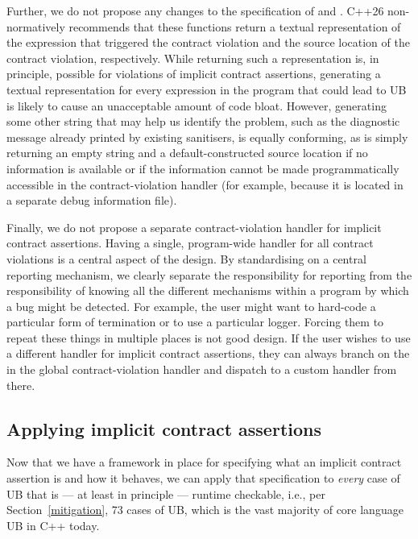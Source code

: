 Further, we do not propose any changes to the specification of  and . C++26 non-normatively recommends that these functions return a textual representation of the expression that triggered the contract violation and the source location of the contract violation, respectively. While returning such a representation is, in principle, possible for violations of implicit contract assertions, generating a textual representation for every expression in the program that could lead to UB is likely to cause an unacceptable amount of code bloat. However, generating some other string that may help us identify the problem, such as the diagnostic message already printed by existing sanitisers, is equally conforming, as is simply returning an empty string and a default-constructed source location if no information is available or if the information cannot be made programmatically accessible in the contract-violation handler (for example,
because it is located in a separate debug information file). 

Finally, we do not propose a separate contract-violation handler for implicit contract assertions. Having a single, program-wide handler for all contract violations is a central aspect of the \cite{P2900R14} design. By standardising on a central reporting mechanism, we clearly separate the responsibility for reporting from the responsibility of knowing all the different mechanisms within a program by which a bug might be detected. For example, the user might want to hard-code a particular form of termination or to use a particular logger. Forcing them to repeat these things in multiple places is not good design. If the user wishes to use a different handler for implicit contract assertions, they can always branch on the  in the global contract-violation handler and dispatch to a custom handler from there.

\subsection{Applying implicit contract assertions}
\label{applyicas}

Now that we have a framework in place for specifying what an implicit contract assertion is and how it behaves, we can apply that specification to \emph{every} case of UB  that is --- at least in principle --- runtime checkable, i.e., per Section~\ref{mitigation}, 73 cases of UB, which is the vast majority of core language UB in C++ today.

